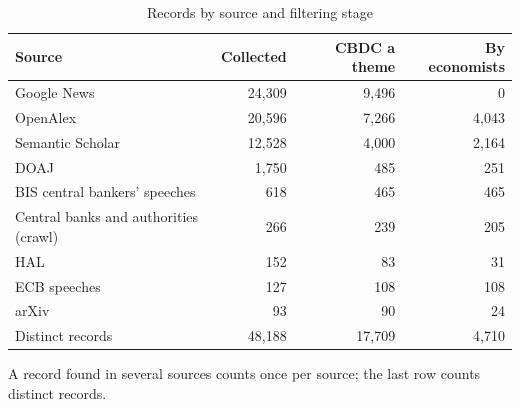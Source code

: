 \begin{table}[htbp]
\centering\small
\caption{Records by source and filtering stage}\label{tab:sources}
\begin{tabular}{@{}lrrr@{}}
\toprule
\textbf{Source} & \textbf{Collected} & \textbf{CBDC a theme} & \textbf{By economists} \\
\midrule
Google News & 24,309 & 9,496 & 0 \\
OpenAlex & 20,596 & 7,266 & 4,043 \\
Semantic Scholar & 12,528 & 4,000 & 2,164 \\
DOAJ & 1,750 & 485 & 251 \\
BIS central bankers' speeches & 618 & 465 & 465 \\
Central banks and authorities (crawl) & 266 & 239 & 205 \\
HAL & 152 & 83 & 31 \\
ECB speeches & 127 & 108 & 108 \\
arXiv & 93 & 90 & 24 \\
\midrule Distinct records & 48,188 & 17,709 & 4,710 \\
\bottomrule
\end{tabular}
\par\smallskip\parbox{0.92\linewidth}{\footnotesize A record found in several sources counts once per source; the last row counts distinct records.}
\end{table}
